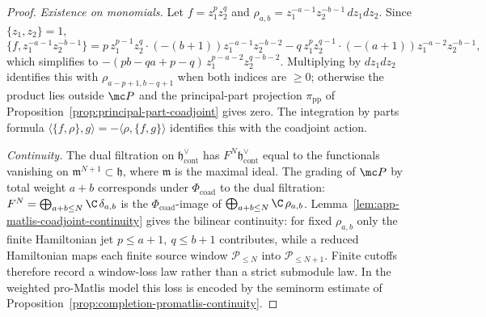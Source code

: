 \documentclass[11pt]{memoir}
\begin{document}
\begin{proof}
  \emph{Existence on monomials.} Let $f=z_1^pz_2^q$ and
  $\rho_{a,b}=z_1^{-a-1}z_2^{-b-1}\,dz_1dz_2$. Since $\{z_1,z_2\}=1$,
  $$\{f,z_1^{-a-1}z_2^{-b-1}\}
    =p\,z_1^{p-1}z_2^q\cdot(-(b+1))z_1^{-a-1}z_2^{-b-2}
    -q\,z_1^pz_2^{q-1}\cdot(-(a+1))z_1^{-a-2}z_2^{-b-1},$$
  which simplifies to $-(pb-qa+p-q)\,z_1^{p-a-2}z_2^{q-b-2}$. Multiplying
  by $dz_1dz_2$ identifies this with $\rho_{a-p+1,b-q+1}$ when both
  indices are $\ge0$; otherwise the product lies outside $\mc P$ and the
  principal-part projection $\pi_{\mathrm{pp}}$ of
  Proposition~\ref{prop:principal-part-coadjoint} gives zero. The
  integration by parts formula
  $\langle\{f,\rho\},g\rangle=-\langle\rho,\{f,g\}\rangle$ identifies
  this with the coadjoint action.

  \emph{Continuity.} The dual filtration on
  $\mathfrak h^\vee_{\mathrm{cont}}$ has
  $F^N\mathfrak h^\vee_{\mathrm{cont}}$ equal to the functionals
  vanishing on $\mathfrak m^{N+1}\subset\mathfrak h$, where
  $\mathfrak m$ is the maximal ideal. The grading of $\mc P$ by total
  weight $a+b$ corresponds under $\Phi_{\mathrm{coad}}$ to the dual
  filtration: $F^N=\bigoplus_{a+b\le N}\C\,\delta_{a,b}$ is the
  $\Phi_{\mathrm{coad}}$-image of
  $\bigoplus_{a+b\le N}\C\,\rho_{a,b}$.
  Lemma~\ref{lem:app-matlis-coadjoint-continuity} gives the bilinear
  continuity: for fixed \(\rho_{a,b}\) only the finite Hamiltonian jet
  \(p\leq a+1,\ q\leq b+1\) contributes, while a reduced Hamiltonian maps
  each finite source window \(\mathcal P_{\leq N}\) into
  \(\mathcal P_{\leq N+1}\).  Finite cutoffs therefore record a
  window-loss law rather than a strict submodule law.  In the weighted
  pro-Matlis model this loss is encoded by the seminorm estimate of
  Proposition~\ref{prop:completion-promatlis-continuity}.


\end{proof}
\end{document}
